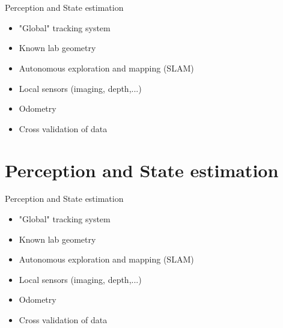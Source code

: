 \documentclass[de]{sdqbeamer}
\begin{document}

\section{}
\begin{frame}{Perception and State estimation}
    \begin{itemize}
        \item "Global" tracking system
        \item Known lab geometry
        \item Autonomous exploration and mapping (SLAM)
        \item Local sensors (imaging, depth,...)
        \item Odometry
        \item Cross validation of data
    \end{itemize}        
\end{frame}



\section{Perception and State estimation}
\begin{frame}{Perception and State estimation}
    \begin{itemize}
        \item "Global" tracking system
        \item Known lab geometry
        \item Autonomous exploration and mapping (SLAM)
        \item Local sensors (imaging, depth,...)
        \item Odometry
        \item Cross validation of data
    \end{itemize}        
\end{frame}

\end{document}

